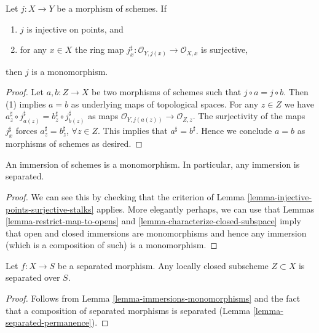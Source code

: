 \begin{lemma}
\label{lemma-injective-points-surjective-stalks}
Let $j : X \to Y$ be a morphism of schemes.
If
\begin{enumerate}
\item $j$ is injective on points, and
\item for any $x \in X$ the ring map
$j^\sharp_x : \mathcal{O}_{Y, j(x)} \to \mathcal{O}_{X, x}$
is surjective,
\end{enumerate}
then $j$ is a monomorphism.
\end{lemma}

\begin{proof}
Let $a, b : Z \to X$ be two morphisms of schemes such that
$j \circ a  = j \circ b$.
Then (1) implies $a = b$ as underlying
maps of topological spaces.
For any $z \in Z$ we have
$a^\sharp_z \circ j^\sharp_{a(z)} = b^\sharp_z \circ j^\sharp_{b(z)}$
as maps $\mathcal{O}_{Y, j(a(z))} \to \mathcal{O}_{Z, z}$.
The surjectivity of the maps
$j^\sharp_x$ forces $a^\sharp_z = b^\sharp_z$, $\forall z \in Z$.
This implies that $a^\sharp = b^\sharp$.
Hence we conclude $a = b$ as morphisms of schemes
as desired.
\end{proof}

\begin{lemma}
\label{lemma-immersions-monomorphisms}
An immersion of schemes is a monomorphism.
In particular, any immersion is separated.
\end{lemma}

\begin{proof}
We can see this by checking that the criterion of
Lemma \ref{lemma-injective-points-surjective-stalks} applies.
More elegantly perhaps, we can use that
Lemmas \ref{lemma-restrict-map-to-opens} and
\ref{lemma-characterize-closed-subspace} imply that
open and closed immersions are monomorphisms and hence
any immersion (which is a composition of such)
is a monomorphism.
\end{proof}

\begin{lemma}
\label{lemma-subscheme-of-separated-scheme}
Let $f : X \to S$ be a separated morphism.
Any locally closed subscheme $Z \subset X$ is separated over $S$.
\end{lemma}

\begin{proof}
Follows from Lemma \ref{lemma-immersions-monomorphisms}
and the fact that a composition of separated morphisms is separated
(Lemma \ref{lemma-separated-permanence}).
\end{proof}

